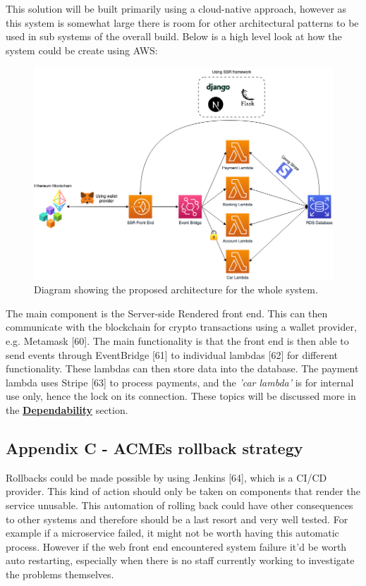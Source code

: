   This solution will be built primarily using a cloud-native approach, however as this system is somewhat large there is room for other 
  architectural patterns to be used in sub systems of the overall build. Below is a high level look at how the system could be create using AWS:

  \begin{figure}[H]
    \centering
    \includegraphics[width=12cm]{assets/architectureEvents.drawio.png}
    \caption{Diagram showing the proposed architecture for the whole system.}
    \label{fig:architecture}
  \end{figure}

  The main component is the Server-side Rendered front end. This can then communicate with the blockchain for crypto transactions using a wallet provider,
  e.g. Metamask [60]. The main functionality is that the front end is then able to send events through EventBridge [61] to individual lambdas [62] for different 
  functionality. These lambdas can then store data into the database. The payment lambda uses Stripe [63] to process payments, and the \textit{'car lambda'} is
  for internal use only, hence the lock on its connection. These topics will be discussed more in the 
  \hyperref[sec:Dependability]{\textbf{Dependability}} section.

\newpage
\subsection{Appendix C - ACMEs rollback strategy}
\label{sec:AppendixC}

  Rollbacks could be made possible by using Jenkins [64], which is a CI/CD provider. This kind of action should only be taken on components that render the
  service unusable. This automation of rolling back could have other consequences to other systems and therefore should be a last resort and very well 
  tested. For example if a microservice failed, it might not be worth having this automatic process. However if the web front end encountered system failure 
  it'd be worth auto restarting, especially when there is no staff currently working to investigate the problems themselves.
  
